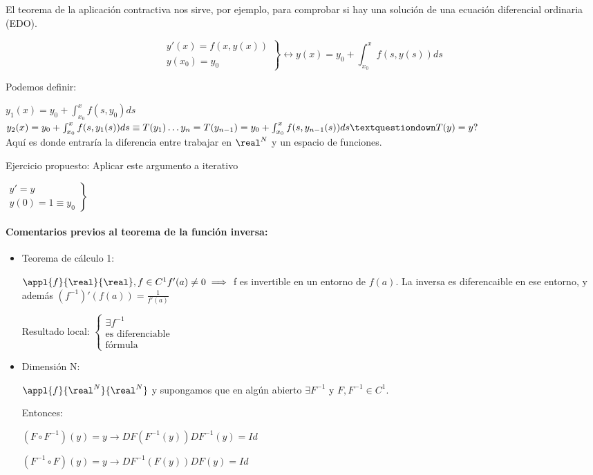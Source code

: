 \documentclass{apuntes}
\newcommand{\invers}[1]{#1 ^ {-1}}
\newcommand{\F}{\invers{F}}
\begin{document}
El teorema de la aplicación contractiva nos sirve, por ejemplo, para comprobar si hay una solución de una ecuación diferencial ordinaria (EDO).

$$\left.\begin{matrix}y'(x) = f(x,y(x))\\
        y(x_0) = y_0
       \end{matrix}\right\} \leftrightarrow y(x) = y_0 + \int_{x_0}^x f(s,y(s)) ds$$

Podemos definir:

$y_1(x) = y_0 + \int_{x_0}^{x} f(s,y_0)ds$\\
$y_2(x) = y_0 + \int_{x_0}^x f(s,y_1(s))ds \equiv T(y_1)\\
\dots\\
y_n = T(y_{n-1}) =  y_0 + \int_{x_0}^x f(s,y_{n-1}(s))ds\\
¿T(y) = y?$\\
Aquí es donde entraría la diferencia entre trabajar en $\real^N$ y un espacio de funciones.

Ejercicio propuesto: Aplicar este argumento a iterativo

$\left. \begin{matrix} y' = y\\
         y(0) = 1 \equiv y_0
        \end{matrix}\right\}$

        
\paragraph{Comentarios previos al teorema de la función inversa:}
\begin{itemize}
 \item Teorema de cálculo 1:

$\appl{f}{\real}{\real}, f\in C^1 f'(a) \neq 0 \implies $ f es invertible en un entorno de $f(a)$. La inversa es diferencaible en ese entorno, y además $(f^{-1})'(f(a)) = \frac{1}{f'(a)}$

Resultado local: $\left\{\begin{matrix} \exists f^{-1} \\ \text{es diferenciable} \\ \text{fórmula}\end{matrix}\right.$

\item Dimensión N:

$\appl{f}{\real^N}{\real^N}$ y supongamos que en algún abierto $\exists F^{-1}$ y $F,F^{-1} \in  C^1$.

Entonces:

$(F\circ \F)(y) = y \rightarrow DF(\F(y))D\F(y) = Id$

$(\F\circ F)(y) = y \rightarrow D\F(F(y))DF(y) = Id$

\end{itemize}
\end{document}
